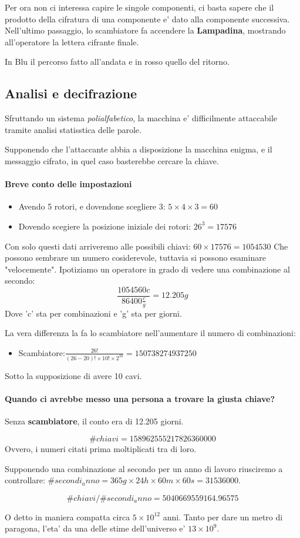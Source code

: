 Per ora non ci interessa capire le singole componenti, ci basta
sapere che il prodotto della cifratura di una componente e' dato
alla componente successiva.
Nell'ultimo passaggio, lo scambiatore fa accendere la \textbf{Lampadina},
mostrando all'operatore la lettera cifrante finale.



In Blu il percorso fatto all'andata e in rosso quello del ritorno.

\subsection{Analisi e decifrazione}
Sfruttando un sistema \textit{polialfabetico}, la macchina e' difficilmente
attaccabile tramite analisi statisstica delle parole.

Supponendo che l'attaccante abbia a disposizione la macchina enigma,
e il messaggio cifrato, in quel caso basterebbe cercare la chiave.

\paragraph{Breve conto delle impostazioni}
\begin{itemize}
\item Avendo 5 rotori, e dovendone scegliere 3: $5 \times 4 \times 3 = 60$
\item Dovendo scegiere la posizione iniziale dei rotori: $26^{3} = 17576$
\end{itemize}
Con solo questi dati arriveremo alle possibili chiavi: $60 \times 17576 = 1054530$
Che possono sembrare un numero cosiderevole, tuttavia si possono esaminare 
"velocemente".
Ipotiziamo un operatore in grado di vedere una combinazione al secondo:
$$\frac{1054560 c}{86400 \frac{c}{g}} = 12.205 g$$
Dove 'c' sta per combinazioni e 'g' sta per giorni.

La vera differenza la fa lo scambiatore nell'aumentare il numero di combinazioni:
\begin{itemize}
\item Scambiatore:$\frac{26!}{(26-20)!\times10!\times2^{10}} = 150738274937250$
\end{itemize}
Sotto la supposizione di avere 10 cavi.

\paragraph{Quando ci avrebbe messo una persona a trovare la giusta chiave?}
Senza \textbf{scambiatore}, il conto era di 12.205 giorni.

$$ \#chiavi = 158962555217826360000 $$
Ovvero, i numeri citati prima moltiplicati tra di loro.

Supponendo una combinazione al secondo per un anno di lavoro riusciremo a
controllare: $ \#secondi_anno = 365g \times 24h \times 60m \times 60s = 31536000$. 

$$ \#chiavi / \#secondi_anno = 5040669559164.96575$$

O detto in maniera compatta circa $5\times10^{12}$ anni.
Tanto per dare un metro di paragona, l'eta' da una delle stime dell'universo e' $13\times10^{9}$.


%
